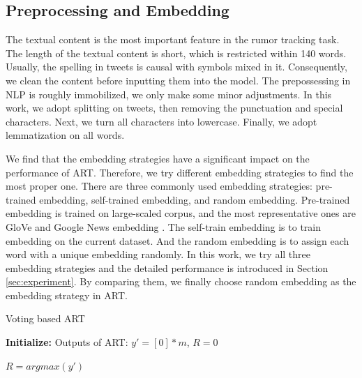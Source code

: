 \subsection{Preprocessing and Embedding}
\label{sec:process_embedding}
The textual content is the most important feature in the rumor tracking task. The length of the textual content is short, which is restricted within 140 words. Usually, the spelling in tweets is causal with symbols mixed in it. Consequently, we clean the content before inputting them into the model. The prepossessing in NLP is roughly immobilized, we only  make some minor adjustments. In this work, we adopt splitting on tweets, then removing the punctuation and special characters. Next, we turn all characters into lowercase. Finally, we adopt lemmatization on all words.

We find that the embedding strategies have a significant impact on the performance of ART. Therefore, we try different embedding strategies to find the most proper one. There are three commonly used embedding strategies: pre-trained embedding, self-trained embedding, and random embedding. Pre-trained embedding is trained on large-scaled corpus, and the most representative ones are GloVe \cite{DBLP:conf/emnlp/PenningtonSM14} and Google News embedding \cite{googlenews}. The self-train embedding is to train embedding on the current dataset. And the random embedding is to assign each word with a unique embedding randomly. In this work, we try all three embedding strategies and the detailed performance is introduced in Section \ref{sec:experiment}. By comparing them, we finally choose random embedding as the embedding strategy in ART.

\begin{algorithm}[tbp]
	\caption{Voting based ART}
	\label{algorithm:art}
	\LinesNumbered %
	\textbf{Initialize:} Outputs of ART: $y' = [0]*m$, $R = 0$ \;
	
	
	$R = argmax(y')$
\end{algorithm}

